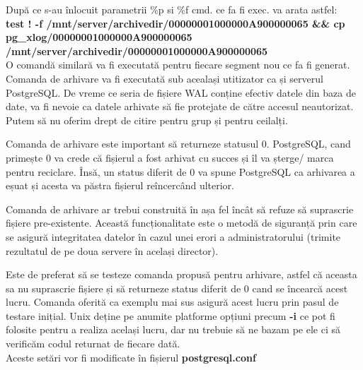 După ce s-au înlocuit parametrii \%p si \%f cmd. ce fa fi exec. va arata astfel: \\
\textbf{test ! -f /mnt/server/archivedir/00000001000000A900000065 \&\& cp pg_xlog/00000001000000A900000065 /mnt/server/archivedir/00000001000000A900000065}\\
O comandă similară va fi executată pentru fiecare segment nou ce fa fi generat. Comanda de arhivare va fi executată sub acealași utitizator ca și serverul PostgreSQL. De vreme ce seria de fișiere WAL conține efectiv datele din baza de date, va fi nevoie ca datele arhivate să fie protejate de către accesul neautorizat. Putem să nu oferim drept de citire pentru grup și pentru ceilalți.
\par
Comanda de arhivare este important să returneze statusul 0. PostgreSQL, cand primește 0 va crede că fișierul a fost arhivat cu succes și îl va șterge/ marca pentru reciclare. Însă, un status diferit de 0 va spune PostgreSQL ca arhivarea a eșuat și acesta va păstra fișierul reîncercând ulterior.
\par
Comanda de arhivare ar trebui construită în așa fel încât să refuze să suprascrie fișiere pre-existente. Această funcționalitate este o metodă de siguranță prin care se asigură integritatea datelor în cazul unei erori a administratorului (trimite rezultatul de pe doua servere în același director).
\par
Este de preferat să se testeze comanda propusă pentru arhivare, astfel că aceasta sa nu suprascrie fișiere și să returneze status diferit de 0 cand se încearcă acest lucru. Comanda oferită ca exemplu mai sus asigură acest lucru prin pasul de testare inițial. Unix deține pe anumite platforme opțiuni precum \textbf{-i} ce pot fi folosite pentru a realiza același lucru, dar nu trebuie să ne bazam pe ele ci să verificăm codul returnat de fiecare dată.
\\
Aceste setări vor fi modificate în fișierul \textbf{postgresql.conf}
\vspace{4cm}

